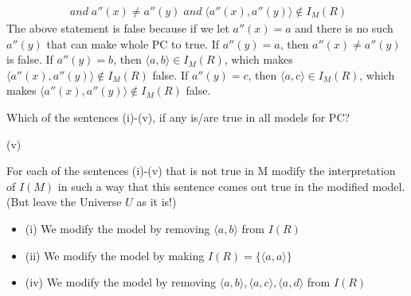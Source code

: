 \begin{QandA}
\begin{QandA}
\begin{QandA}
\begin{answered}
\begin{align*}
				\; and \;  a''(x) \ne a''(y) \; and \; 
				\langle a''(x), a''(y) \rangle \not\in I_{M}(R)
				\end{align*}
				The above statement is false because if we let $a''(x) = a$ and there is no such $a''(y)$ that can make whole PC to
				true. If $a''(y) = a$, then $a''(x) \ne a''(y)$ is false. If $a''(y) = b$, then $\langle a, b \rangle \in I_M(R)$,
				which makes $\langle a''(x), a''(y) \rangle \not\in I_{M}(R)$ false. If $a''(y) = c$, then $\langle a, c \rangle \in I_M(R)$,
				which makes $\langle a''(x), a''(y) \rangle \not\in I_{M}(R)$ false.
			\end{answered}
		\end{QandA}
		\item Which of the sentences (i)-(v), if any is/are true in all models for PC?
		\begin{answered}
			(v)
		\end{answered}
		\item For each of the sentences (i)-(v) that is not true in M modify the interpretation of $I(M)$ in such a way that this sentence comes out true in the modified model. (But leave the Universe $U$ as it is!)
		\begin{answered}
			\begin{itemize}
			\item (i) We modify the model by removing $\langle a,b \rangle$ from $I(R)$ 
			\item (ii) We modify the model by making $I(R) = \lbrace \langle a, a \rangle \rbrace$
			\item (iv) We modify the model by removing $\langle a,b \rangle, \langle a,c \rangle, \langle a,d \rangle$ from $I(R)$ 
			\end{itemize}
		\end{answered}
	\end{QandA}
\end{QandA}